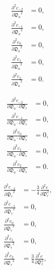 \documentclass[a4paper,11pt,twoside,openright]{book}
\def\lthtmlcheckvsize{\ifdim\ht\sizebox<\vsize 
  \ifdim\wd\sizebox<\hsize\expandafter\hfill\fi \expandafter\vfill
  \else\expandafter\vss\fi}%
\begin{document}
{\newpage\clearpage
\setcounter{equation}{132}
%
\begin{subequations}\begin{align}
\frac{\partial^2 c_{-2}}{{\partial \mathfrak{D}_a}^2}  &=  0, \\
\frac{\partial^2 c_{-1}}{{\partial \mathfrak{D}_a}^2} &= 0, \\
\frac{\partial^2 c_{0}}{{\partial \mathfrak{D}_a}^2}  &= 0, \\
\frac{\partial^2 c_{1}}{{\partial \mathfrak{D}_a}^2}  &= 0, \\
\frac{\partial^2 c_{2}}{{\partial \mathfrak{D}_a}^2}  &= 0.
\end{align}\end{subequations}%
\lthtmldisplayZ
\lthtmlcheckvsize\clearpage}

{\newpage\clearpage
\setcounter{equation}{133}
%
\begin{subequations}\begin{align}
\frac{\partial^2 c_{-2}}{\partial \mathfrak{D}_a \cdot \partial \mathfrak{D}_r}  &=  0, \\
\frac{\partial^2 c_{-1}}{\partial \mathfrak{D}_a \cdot \partial \mathfrak{D}_r} &= 0, \\
\frac{\partial^2 c_{0}}{\partial \mathfrak{D}_a \cdot \partial \mathfrak{D}_r}  &= 0, \\
\frac{\partial^2 c_{1}}{\partial \mathfrak{D}_a \cdot \partial \mathfrak{D}_r}  &= 0, \\
\frac{\partial^2 c_{2}}{\partial \mathfrak{D}_a \cdot \partial \mathfrak{D}_r}  &= 0.
\end{align}\end{subequations}%
\lthtmldisplayZ
\lthtmlcheckvsize\clearpage}

{\newpage\clearpage
\setcounter{equation}{134}
%
\begin{subequations}\begin{align}
\frac{\partial^2 c_{-2}}{{\partial \mathfrak{D}_r}^2}  &=  - \frac{3}{4} \frac{\partial^2 e}{\partial \mathfrak{D}_r^2}, \\
\frac{\partial^2 c_{-1}}{{\partial \mathfrak{D}_r}^2} &= 0, \\
\frac{\partial^2 c_{0}}{{\partial \mathfrak{D}_r}^2}  &= 0, \\
\frac{\partial^2 c_{1}}{{\partial \mathfrak{D}_r}^2}  &= 0, \\
\frac{\partial^2 c_{2}}{{\partial \mathfrak{D}_r}^2}  &= \frac{3}{4} \frac{\partial^2 e}{\partial \mathfrak{D}_r^2},
\end{align}\end{subequations}%
\lthtmldisplayZ
\lthtmlcheckvsize\clearpage}
\end{document}

